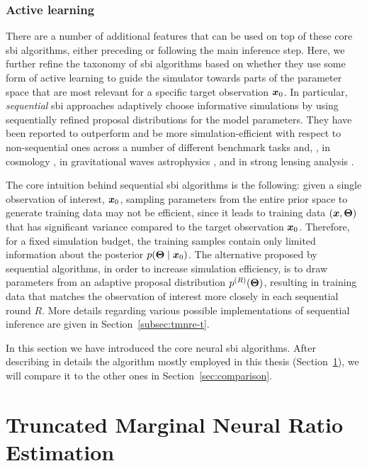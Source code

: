 \subsubsection{Active learning} There are a number of additional features that can be used on top of these core \gls*{sbi} algorithms, either preceding or following the main inference step. Here, we further refine the taxonomy of \gls*{sbi} algorithms based on whether they use some form of {active learning} to guide the simulator towards parts of the parameter space that are most relevant for a specific target observation $\bm{x}_0$. In particular, \emph{sequential} \gls*{sbi} approaches adaptively choose informative simulations by using sequentially refined proposal distributions for the model parameters. They have been reported to outperform and be more simulation-efficient with respect to non-sequential ones across a number of different benchmark tasks \citep{Lueckmann:2021aa} and, \eg, in cosmology \cite{Cole:2021gwr}, in gravitational waves astrophysics \cite{Bhardwaj:2023xph}, and in strong lensing analysis \cite{wagnercarena2024strong}. 

The core intuition behind sequential \gls*{sbi} algorithms is the following: given a single observation of interest, $\bm{x}_0$, sampling parameters from the entire prior space to generate training data may not be efficient, since it leads to training data $(\bm{x}, \bm{\Theta})$ that has significant variance compared to the target observation $\bm{x}_0$. Therefore, for a fixed simulation budget, the training samples contain only limited information about the posterior $p(\bm{\Theta}\mid\bm{x}_0)$. The alternative proposed by sequential algorithms, in order to increase simulation efficiency, is to draw parameters from an adaptive proposal distribution $p^{(R)}(\bm{\Theta})$, resulting in training data that matches the observation of interest more closely in each sequential round $R$. More details regarding various possible implementations of sequential inference are given in Section~\ref{subsec:tmnre-t}.

\medskip

In this section we have introduced the core neural \gls*{sbi} algorithms. After describing in details the algorithm mostly employed in this thesis (Section~\ref{sec:tmnre}), we will compare it to the other ones in Section~\ref{sec:comparison}.


\section{Truncated Marginal Neural Ratio Estimation} \label{sec:tmnre}

